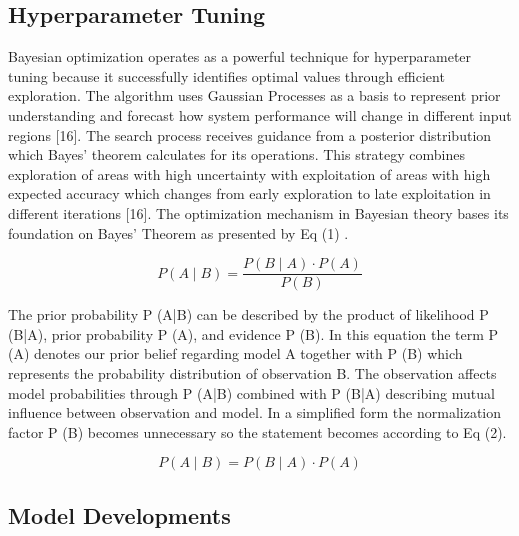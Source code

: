 \documentclass[runningheads]{llncs}
\begin{document}
\subsection{Hyperparameter Tuning}

Bayesian optimization operates as a powerful technique for hyperparameter tuning because it successfully identifies optimal values through efficient 
exploration. The algorithm uses Gaussian Processes as a basis to represent prior understanding and forecast how system performance will change in different input regions [16]. The search process receives guidance from a posterior distribution which Bayes' theorem calculates for its operations. This strategy combines exploration of areas with high uncertainty with exploitation of areas with high expected accuracy which changes from early exploration to late exploitation in different iterations [16].
The optimization mechanism in Bayesian theory bases its foundation on Bayes’ Theorem as presented by Eq (1) \cite{tuncal2020}. 

\begin{equation}
    P(A \mid B) = \frac{P(B \mid A) \cdot P(A)}{P(B)}
    \label{eq:bayes_theorem}
\end{equation}

The prior probability P (A|B) can be described by the product of likelihood P (B|A), prior probability P (A), and evidence P (B). In this equation the term P (A) denotes our prior belief regarding model A together with P (B) which represents the probability distribution of observation B. The observation affects model probabilities through P (A|B) combined with P (B|A) describing mutual influence between observation and model. In a simplified form the normalization factor P (B) becomes unnecessary so the statement becomes according to Eq (2).

\begin{equation}
    P(A \mid B) = P(B \mid A) \cdot P(A)
    \label{eq:conditional_probability}
\end{equation}

\subsection{Model Developments}
\end{document}
